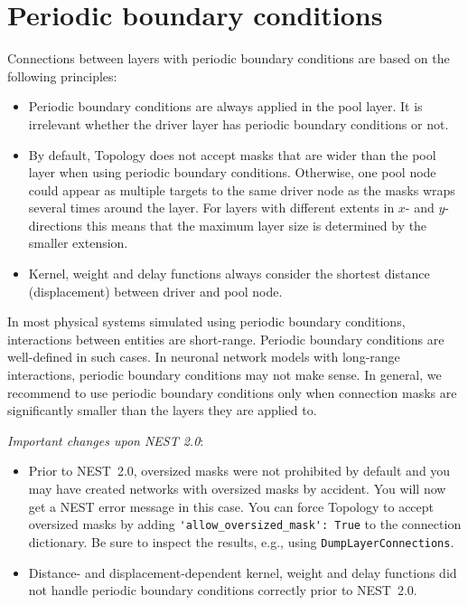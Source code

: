 \documentclass[a4paper,12pt]{report}
\begin{document}
\section{Periodic boundary conditions}\label{sec:conn_pbc}

Connections between layers with periodic boundary
conditions are based
on the following principles:
\begin{itemize}
\item Periodic boundary conditions are always applied in the pool
  layer. It is irrelevant whether the driver layer has periodic
  boundary conditions or not.
\item By default, Topology does not accept masks that are wider than
  the pool layer when using periodic boundary conditions. Otherwise,
  one pool node could appear as multiple targets to the same driver
  node as the masks wraps several times around the layer. For layers
  with different extents in $x$- and $y$-directions this means that
  the maximum layer size is determined by the smaller extension.
\item Kernel, weight and delay functions always consider the shortest
  distance (displacement) between driver and pool node.
\end{itemize}
In most physical systems simulated using periodic boundary conditions,
interactions between entities are short-range. Periodic boundary
conditions are well-defined in such cases. In neuronal network models
with long-range interactions, periodic boundary conditions may not
make sense. In general, we recommend to use periodic boundary
conditions only when connection masks are significantly smaller than
the layers they are applied to.

\emph{Important changes upon NEST 2.0}: 
\begin{itemize}
\item Prior to NEST~2.0, oversized
masks were not prohibited by default and you may have created networks
with oversized masks by accident. You will now get a NEST error
message in this case. You can force Topology to accept oversized
masks
by adding \lstinline!'allow_oversized_mask': True! to the connection
dictionary. Be sure to inspect the results, e.g., using
\lstinline!DumpLayerConnections!.
\item Distance- and displacement-dependent kernel, weight and delay
  functions did not handle periodic boundary conditions correctly
  prior to NEST~2.0.
\end{itemize}
\end{document}
